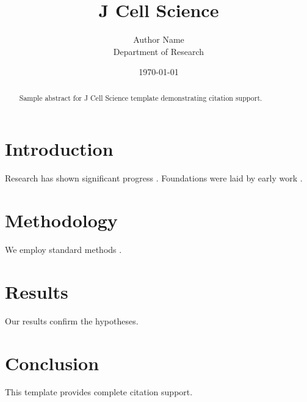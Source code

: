 \documentclass{wiley-nj}
\title{J Cell Science}
\author{Author Name \\ \small Department of Research}
\date{\today}
\begin{document}
\maketitle

\begin{abstract}
Sample abstract for J Cell Science template demonstrating citation support.
\end{abstract}

\section{Introduction}
Research has shown significant progress \citep{einstein1905}. Foundations were laid by early work \citep{turing1950}.

\section{Methodology}
We employ standard methods \citep{knuth1984}.

\section{Results}
Our results confirm the hypotheses.

\section{Conclusion}
This template provides complete citation support.



\end{document}
